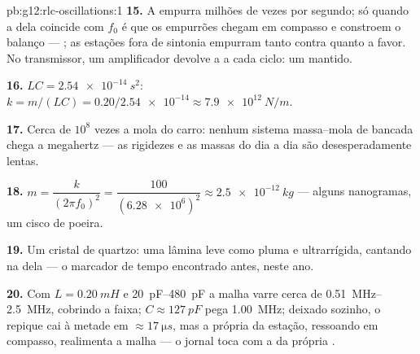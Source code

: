\begin{solution}{pb:g12:rlc-oscillations:1}
\textbf{15.} A  empurra milhões de vezes por segundo; só quando a
 dela coincide com $f_0$ é que os empurrões chegam em compasso
e constroem o balanço --- ; as estações fora de sintonia
empurram tanto contra quanto a favor. No transmissor, um amplificador
devolve a   a cada ciclo: um  mantido.

\textbf{16.} $LC = \qty{2.54e-14}{s^2}$:
$k = m/(LC) = 0.20/\num{2.54e-14} \approx \qty{7.9e12}{N/m}$.

\textbf{17.} Cerca de $10^8$ vezes a mola do carro: nenhum sistema
massa--mola de bancada chega a megahertz --- as rigidezes e as massas do
dia a dia são desesperadamente lentas.

\textbf{18.} $m = \dfrac{k}{(2\pi f_0)^2} = \dfrac{100}
{(\num{6.28e6})^2} \approx \qty{2.5e-12}{kg}$ --- alguns nanogramas, um
cisco de poeira.

\textbf{19.} Um cristal de quartzo: uma lâmina leve como pluma e
ultrarrígida, cantando na  dela --- o marcador de tempo
encontrado antes, neste ano.

\textbf{20.} Com $L = \qty{0.20}{mH}$ e \qtyrange{20}{480}{pF} a malha
varre cerca de \qtyrange{0.51}{2.5}{MHz}, cobrindo a faixa;
$C \approx \qty{127}{pF}$ pega \qty{1.00}{MHz}; deixado sozinho, o
repique cai à metade em $\approx \qty{17}{\micro s}$, mas a própria 
da estação, ressoando em compasso, realimenta a malha --- o jornal toca
com a  da própria .
\end{solution}
